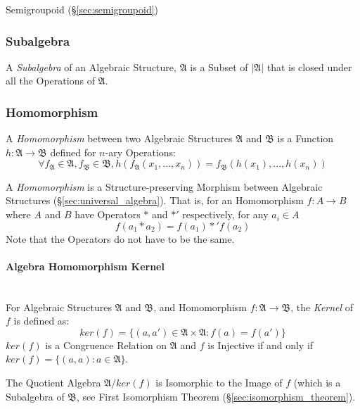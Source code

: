 Semigroupoid (\S\ref{sec:semigroupoid})



\subsubsection{Subalgebra}\label{sec:subalgebra}

A \emph{Subalgebra} of an Algebraic Structure, $\mathfrak{A}$ is a
Subset of $|\mathfrak{A}|$ that is closed under all the Operations of
$\mathfrak{A}$.



\subsubsection{Homomorphism}\label{sec:homomorphism}

A \emph{Homomorphism} between two Algebraic Structures $\mathfrak{A}$
and $\mathfrak{B}$ is a Function $h: \mathfrak{A} \rightarrow
\mathfrak{B}$ defined for $n$-ary Operations:
\[
  \forall f_\mathfrak{A} \in \mathfrak{A}, f_\mathfrak{B} \in
  \mathfrak{B}, h(f_\mathfrak{A}(x_1, ..., x_n)) =
  f_\mathfrak{B}(h(x_1), ..., h(x_n))
\]


A \emph{Homomorphism} is a Structure-preserving Morphism between
Algebraic Structures (\S\ref{sec:universal_algebra}). That is, for
an Homomorphism $f : A \rightarrow B$ where $A$ and $B$ have Operators
$*$ and $*'$ respectively, for any $a_i \in A$
\[
  f(a_1 * a_2) = f(a_1) *' f(a_2)
\]
\fist Note that the Operators do not have to be the same.



\paragraph{Algebra Homomorphism Kernel}\hfill
\label{sec:algebra_homomorphism_kernel} \hfill \\

For Algebraic Structures $\mathfrak{A}$ and $\mathfrak{B}$, and
Homomorphism $f: \mathfrak{A} \rightarrow \mathfrak{B}$, the
\emph{Kernel} of $f$ is defined as:
\[
    ker(f) = \{ (a,a') \in \mathfrak{A} \times \mathfrak{A} : f(a) = f(a') \}
\]
$ker(f)$ is a Congruence Relation on $\mathfrak{A}$ and $f$ is Injective if and
only if $ker(f) = \{(a,a) : a \in \mathfrak{A}\}$.

The Quotient Algebra $\mathfrak{A}/ker(f)$ is Isomorphic to the Image
of $f$ (which is a Subalgebra of $\mathfrak{B}$, see First Isomorphism
Theorem (\S\ref{sec:isomorphism_theorem}).



